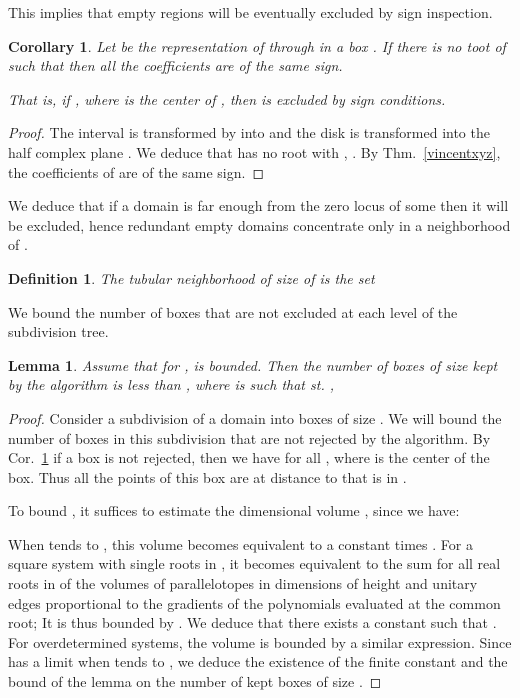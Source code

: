 \documentclass{sig-alternate}
\newtheorem{lemma}[theorem]{Lemma}
\newtheorem{corollary}[theorem]{Corollary}
\newtheorem{definition}[theorem]{Definition}\newtheorem{dxample}[theorem]{Example}
\begin{document}
This implies that empty regions will be eventually excluded by sign inspection.

\begin{corollary} \label{corxyz}
  Let 
  be the representation of  through  in a box . If
  there is no toot  of  such that  
   then all the coefficients  are of the same sign.

That is, if ,
where  is the center of , then  is excluded by sign conditions. 
\end{corollary}
\begin{proof}
  The interval  is transformed by  into
   and the disk  is transformed into the half complex plane
  .  We deduce that  has no root with , .  By Thm.~\ref{vincentxyz}, the
  coefficients of  are of the same sign.
\end{proof}

We deduce that if a domain is far enough from the zero locus of
some  then it will be excluded, hence redundant empty domains
concentrate only in a neighborhood of .

\begin{definition}
The tubular neighborhood of size  of  is the set 

\end{definition}

We bound the number of boxes that are not excluded at each level of the subdivision tree.
\begin{lemma} Assume that for ,
   is bounded.
Then the number of boxes of size  kept by the algorithm
is less than  , where  is such that
   st. ,

\end{lemma}
\begin{proof}
  Consider a subdivision of a domain  into boxes of size
  . We will bound the number  of boxes in this
  subdivision that are not rejected by the algorithm. By
  Cor.~\ref{corxyz} if a box is not rejected, then we have for all
   , where  is the center of the box.
  Thus all the points of this box are at distance  to 
that is in .

To bound , it suffices to estimate the dimensional volume , since we have:

 
When  tends to , this volume becomes equivalent to a
constant times . For a square system with single
roots in , it becomes equivalent to the sum for all real roots
 in  of the volumes of parallelotopes in  dimensions
of height  and unitary edges proportional to the
gradients of the polynomials evaluated at the common root; It is thus
bounded by . We deduce that there
exists a constant  such that
. For
overdetermined systems, the volume is bounded by a similar
expression. Since  has a limit
when  tends to , we deduce the existence of the finite
constant  and the bound of the lemma on the number of kept boxes of
size .
\end{proof}
\end{document}
